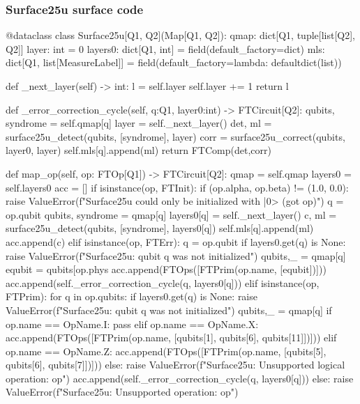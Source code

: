 \subsubsection{Surface25u surface code}

  \begin{comment}
    \begin{sh}
    printf '\\begin{%
    cat $PROJECT_ROOT/python/qecsurface/qeccs.py | sedlines.sh 'Surface25u'
    printf '\\end{%
    \end{sh}
  \end{comment}

  \begin{python}
  @dataclass
  class Surface25u[Q1, Q2](Map[Q1, Q2]):
    qmap: dict[Q1, tuple[list[Q2], Q2]]
    layer: int = 0
    layers0: dict[Q1, int] = field(default_factory=dict)
    mls: dict[Q1, list[MeasureLabel]] = field(default_factory=lambda: defaultdict(list))
  
    def _next_layer(self) -> int:
      l = self.layer
      self.layer += 1
      return l
  
    def _error_correction_cycle(self, q:Q1, layer0:int) -> FTCircuit[Q2]:
      qubits, syndrome = self.qmap[q]
      layer = self._next_layer()
      det, ml = surface25u_detect(qubits, [syndrome], layer)
      corr = surface25u_correct(qubits, layer0, layer)
      self.mls[q].append(ml)
      return FTComp(det,corr)
  
    def map_op(self, op: FTOp[Q1]) -> FTCircuit[Q2]:
      qmap = self.qmap
      layers0 = self.layers0
      acc = []
      if isinstance(op, FTInit):
        if (op.alpha, op.beta) != (1.0, 0.0):
          raise ValueError(f"Surface25u could only be initialized with |0> (got {op})")
        q = op.qubit
        qubits, syndrome = qmap[q]
        layers0[q] = self._next_layer()
        c, ml = surface25u_detect(qubits, [syndrome], layers0[q])
        self.mls[q].append(ml)
        acc.append(c)
      elif isinstance(op, FTErr):
        q = op.qubit
        if layers0.get(q) is None:
          raise ValueError(f"Surface25u: qubit {q} was not initialized")
        qubits,_ = qmap[q]
        equbit = qubits[op.phys %
        acc.append(FTOps([FTPrim(op.name, [equbit])]))
        acc.append(self._error_correction_cycle(q, layers0[q]))
      elif isinstance(op, FTPrim):
        for q in op.qubits:
          if layers0.get(q) is None:
            raise ValueError(f"Surface25u: qubit {q} was not initialized")
          qubits,_ = qmap[q]
          if op.name == OpName.I:
            pass
          elif op.name == OpName.X:
            acc.append(FTOps([FTPrim(op.name, [qubits[1], qubits[6], qubits[11]])]))
          elif op.name == OpName.Z:
            acc.append(FTOps([FTPrim(op.name, [qubits[5], qubits[6], qubits[7]])]))
          else:
            raise ValueError(f"Surface25u: Unsupported logical operation: {op}")
          acc.append(self._error_correction_cycle(q, layers0[q]))
      else:
        raise ValueError(f"Surface25u: Unsupported operation: {op}")
  \end{python}

% 

